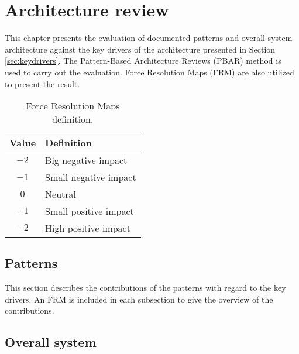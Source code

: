 
\clearpage
\chapter{Architecture review}
\label{ch:archreview}
This chapter presents the evaluation of documented patterns and overall system architecture
against the key drivers of the architecture presented in Section \ref{sec:keydrivers}. The  Pattern-Based Architecture Reviews (PBAR) \cite{pbar} method is used to carry out the
evaluation. Force Resolution Maps (FRM) are also utilized to present the result.

\begin{table}[H]
\centering
\caption{Force Resolution Maps definition.}
\label{tab:frm-table}
\begin{tabular}{cl}
\textbf{Value} & \textbf{Definition} \\ \toprule
            $-2$   & Big negative impact \\
            $-1$   & Small negative impact \\
            $0$    & Neutral \\
            $+1$   & Small positive impact \\
            $+2$   & High positive impact 
\end{tabular}
\end{table}

\section{Patterns}
This section describes the contributions of the patterns with regard to the key
drivers. An FRM is included in each subsection to give the overview of the
contributions.



\section{Overall system}